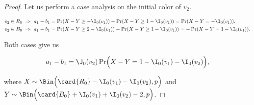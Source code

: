 \documentclass{toc}
\begin{document}
\begin{proof}
				\noindent Let us perform  %
				a %
				case analysis on 
				the initial color of $v_2$.  %
				\begin{linenomath}\begin{equation*}
						\begin{aligned}
							v_2 \in R_0
							& ~\Rightarrow~
							a_1 - b_1 = \Pr(X - Y \ge - \I_0(v_1)) - \Pr(X - Y \ge 1 - \I_0(v_1)) = \Pr(X - Y = - \I_0(v_1)).
							\\
							v_2 \in B_0
							& ~\Rightarrow~
							a_1 - b_1 = \Pr(X - Y \ge 2 - \I_0(v_1)) - \Pr(X - Y \ge 1 - \I_0(v_1)) = -\Pr(X - Y = 1 - \I_0(v_1)).
						\end{aligned}
				\end{equation*}\end{linenomath}
				\noindent Both cases give us
				\begin{linenomath}\begin{equation*}
						a_1 - b_1 = \J_0(v_2)\Pr\Bigl(X - Y = 1 - \I_0(v_1) - \I_0(v_2)\Bigr),
				\end{equation*}\end{linenomath}
				where $X\sim \Bin\Bigl(\card{R_0} - \I_0(v_1) - \I_0(v_2), p\Bigr)$
				and $Y\sim \Bin\Bigl(\card{B_0} + \I_0(v_1) + \I_0(v_2) - 2, p\Bigr)$.
				

\end{proof}
\end{document}
